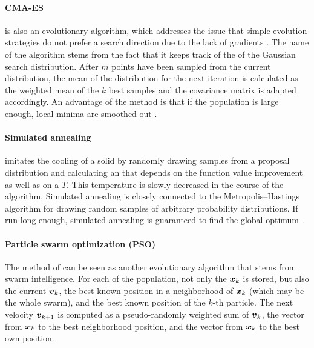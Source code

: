 \paragraph{CMA-ES}

\cite{Hansen03Reducing}
is also an evolutionary algorithm,
which addresses the issue
that simple evolution strategies do not prefer a search direction
due to the lack of gradients \cite{Toussaint15Introduction}.
The name of the algorithm stems from the fact
that it keeps track of the  of the
Gaussian search distribution.
After $m$ points have been sampled from the current distribution,
the mean of the distribution for the next iteration
is calculated as the weighted mean of the $k$ best samples and
the covariance matrix is adapted accordingly.
An advantage of the method is that if the population is large enough,
local minima are smoothed out \cite{Toussaint15Introduction}.

\paragraph{Simulated annealing}

imitates the cooling of a solid by randomly drawing samples
from a proposal distribution and calculating an 
that depends on the function value improvement as well as
on a  $T$.
This temperature is slowly decreased in the course of the algorithm.
Simulated annealing is closely connected to the
Metropolis--Hastings algorithm for drawing random samples of arbitrary
probability distributions.
If run long enough,
simulated annealing is guaranteed to find the global
optimum \cite{Toussaint15Introduction}.

\paragraph{Particle swarm optimization (PSO)}

The method of 
can be seen as another evolutionary algorithm
that stems from swarm intelligence.
For each  of the population,
not only the  ${\boldsymbol{x}}_k$ is stored,
but also the current  ${\boldsymbol{v}}_k$,
the best known position in a neighborhood of ${\boldsymbol{x}}_k$
(which may be the whole swarm), and
the best known position of the $k$-th particle.
The next velocity ${\boldsymbol{v}}_{k+1}$ is computed as
a pseudo-randomly weighted sum of ${\boldsymbol{v}}_k$,
the vector from ${\boldsymbol{x}}_k$ to the best neighborhood position, and
the vector from ${\boldsymbol{x}}_k$ to the best own position.

